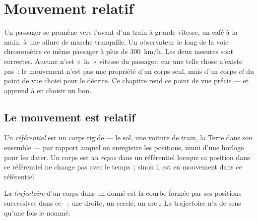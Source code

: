 \chapter{Mouvement relatif}\label{ch:g10:relative-motion}

Un passager se promène vers l'avant d'un train à grande vitesse, un café
à la main, à une allure de marche tranquille. Un observateur le long de
la voie chronomètre ce même passager à plus de \qty{300}{km/h}. Les deux
mesures sont correctes. Aucune n'est «~la~» vitesse du passager, car
une telle chose n'existe pas~: le mouvement n'est pas une propriété d'un
corps seul, mais d'un corps \emph{et} du point de vue choisi pour le
décrire. Ce chapitre rend ce point de vue précis --- et apprend à en
choisir un bon.

\section{Le mouvement est relatif}

\begin{definition}[Référentiel]\label{def:g10:relative-motion:frame}
Un \emph{référentiel} est un corps rigide --- le sol,
une voiture de train, la Terre dans son ensemble --- par rapport auquel
on enregistre les positions, muni d'une horloge pour les dater. Un corps
est \emph{au repos} dans un référentiel lorsque sa position
dans ce référentiel ne change pas avec le temps~; sinon il est en
mouvement dans ce référentiel.
\end{definition}

\begin{definition}[Trajectoire]\label{def:g10:relative-motion:trajectory}
La \emph{trajectoire} d'un corps dans un
 donné est la courbe formée par ses positions
successives dans ce ~: une droite, un cercle, un arc\dots{}
La trajectoire n'a de sens qu'une fois le  nommé.
\end{definition}

